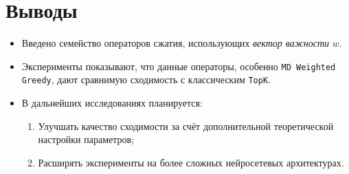 \documentclass{article}
\begin{document}
\section{Выводы}
\begin{itemize}
\item Введено семейство операторов сжатия, использующих \emph{вектор важности} $w$.
\item Эксперименты показывают, что данные операторы, особенно \texttt{MD Weighted Greedy}, дают сравнимую сходимость с классическим \texttt{TopK}.
\item В дальнейших исследованиях планируется:
  \begin{enumerate}
  \item Улучшать качество сходимости за счёт дополнительной теоретической настройки параметров;
  \item Расширять эксперименты на более сложных нейросетевых архитектурах.
  \end{enumerate}
\end{itemize}
\end{document}
